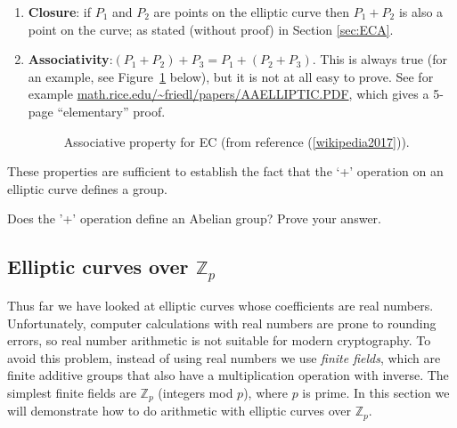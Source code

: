 \begin{enumerate}[1.]
\item \textbf{Closure}: if $P_1$ and $P_2$ are points on the elliptic curve then $P_1 + P_2$ is also a point on the curve; as stated (without proof) in Section \ref{sec:ECA}.
\item \textbf{Associativity}:$(P_1 + P_2) + P_3 = P_1 + (P_2 + P_3)$. This is always true (for an example, see Figure~\ref{fig:DH:DHKE_12} below),  but it is not at all easy to prove. See for example \url{math.rice.edu/~friedl/papers/AAELLIPTIC.PDF}, which gives a 5-page ``elementary'' proof.
\begin{figure}[htbp]
	  \caption{\label{fig:DH:DHKE_12} Associative property for EC (from reference (\ref{wikipedia2017})).}
\end{figure}
\end{enumerate}

These properties are sufficient to establish the fact that the `+' operation on an elliptic curve defines a group.

\begin{exercise}{}
Does the '+' operation define an Abelian group? Prove your answer.
\end {exercise}

\subsection{Elliptic curves over $\mathbb{Z}_p$}\label{sec:ECA2} 

Thus far we have looked at elliptic curves whose coefficients are real numbers. Unfortunately, computer calculations with real numbers are prone to rounding errors, so real number arithmetic is not suitable for modern cryptography. To avoid this problem,  instead of using real numbers we use \emph{finite fields}, which are finite additive groups that also have a multiplication operation with inverse. The simplest finite fields are  $\mathbb{Z}_p$ (integers mod $p$),  where $p$ is prime. In this section we will demonstrate how to do arithmetic with elliptic curves over $\mathbb{Z}_p$.

